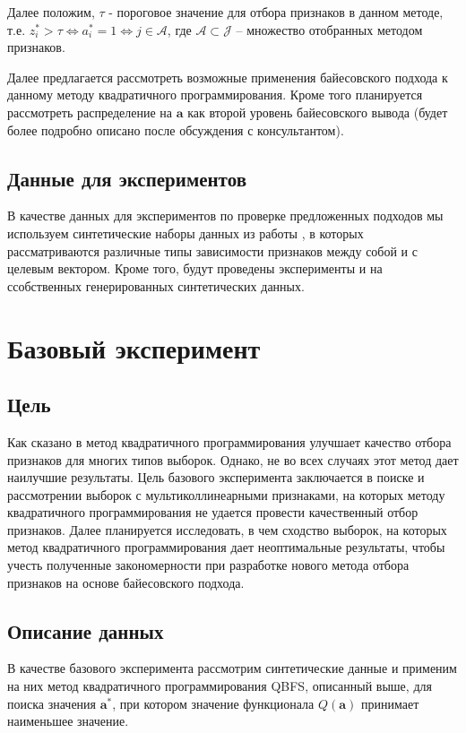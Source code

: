 \documentclass[12pt, twoside]{article}
\newcommand{\ba}{\mathbf{a}}
\newcommand{\bJ}{\mathcal{J}}
\begin{document}
Далее положим, $\tau$ - пороговое значение для отбора признаков в данном методе, т.е. $z_i^* > \tau \Leftrightarrow a_i^* = 1 \Leftrightarrow j \in \mathcal{A}$, где $\mathcal{A} \subset \bJ$ -- множество отобранных методом признаков.

Далее предлагается рассмотреть возможные применения байесовского подхода к данному методу квадратичного программирования. Кроме того планируется рассмотреть распределение на $\ba$ как второй уровень байесовского вывода (будет более подробно описано после обсуждения с консультантом).


\subsection{Данные для экспериментов}

В качестве данных для экспериментов по проверке предложенных подходов мы используем синтетические наборы данных из работы \cite{Katrutsa15}, в которых рассматриваются различные типы зависимости признаков между собой и с целевым вектором. Кроме того, будут проведены эксперименты и на ссобственных генерированных синтетических данных.


\section{Базовый эксперимент}

\subsection{Цель}

Как сказано в \cite{KatrutsaS17} метод квадратичного программирования улучшает качество отбора признаков для многих типов выборок. Однако, не во всех случаях этот метод дает наилучшие результаты. Цель базового эксперимента заключается в поиске и рассмотрении выборок с мультиколлинеарными признаками, на которых методу квадратичного программирования не удается провести качественный отбор признаков. Далее планируется исследовать, в чем сходство выборок, на которых метод квадратичного программирования дает неоптимальные результаты, чтобы учесть полученные закономерности при разработке нового метода отбора признаков на основе байесовского подхода.

\subsection{Описание данных}

В качестве базового эксперимента рассмотрим синтетические данные и применим на них метод квадратичного программирования QBFS, описанный выше, для поиска значения $\ba^*$, при котором значение функционала $Q(\ba)$ принимает наименьшее значение.
\end{document}
